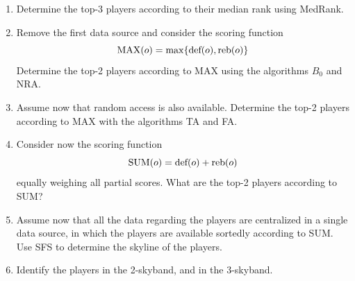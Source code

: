 \documentclass[12pt, a4paper]{report}
\begin{document}
        \begin{enumerate}
            \item Determine the top-3 players according to their median rank using MedRank.
            \item Remove the first data source and consider the scoring function
                \[\textnormal{MAX}(o) = \max\{\textnormal{def}(o), \textnormal{reb}(o)\}\] 
                Determine the top-2 players according to MAX using the algorithms $B_0$ and NRA.
            \item Assume now that random access is also available. Determine the top-2 players according to MAX with the algorithms TA and FA.
            \item Consider now the scoring function 
                \[\textnormal{SUM}(o) = \textnormal{def}(o) + \textnormal{reb}(o)\] 
                equally weighing all partial scores. What are the top-2 players according to SUM?
            \item Assume now that all the data regarding the players are centralized in a single data source, in which the players are available sortedly according to SUM. 
                Use SFS to determine the skyline of the players.
            \item Identify the players in the 2-skyband, and in the 3-skyband.
        \end{enumerate}
\end{document}
